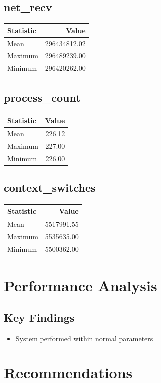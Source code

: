 \documentclass[11pt]{article}
\begin{document}
\subsection{net_recv}
\begin{tabular}{lr}
\toprule
Statistic & Value \\
\midrule
Mean & 296434812.02 \\
Maximum & 296489239.00 \\
Minimum & 296420262.00 \\
\bottomrule
\end{tabular}


\subsection{process_count}
\begin{tabular}{lr}
\toprule
Statistic & Value \\
\midrule
Mean & 226.12 \\
Maximum & 227.00 \\
Minimum & 226.00 \\
\bottomrule
\end{tabular}


\subsection{context_switches}
\begin{tabular}{lr}
\toprule
Statistic & Value \\
\midrule
Mean & 5517991.55 \\
Maximum & 5535635.00 \\
Minimum & 5500362.00 \\
\bottomrule
\end{tabular}


\section{Performance Analysis}
\subsection{Key Findings}
\begin{itemize}
\item System performed within normal parameters
\end{itemize}

\section{Recommendations}
\begin{itemize}

\end{itemize}
\end{document}
